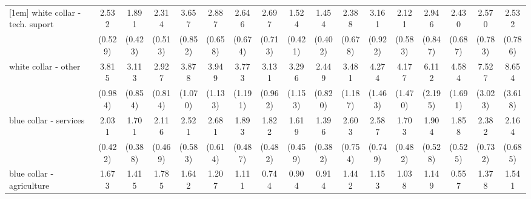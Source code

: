 {\begin{tabular}{l*{16}{c}}
[1em]
white collar - tech. suport&       2.532\sym{***}&       1.891\sym{**} &       2.314\sym{***}&       3.657\sym{***}&       2.887\sym{***}&       2.646\sym{***}&       2.697\sym{***}&       1.524         &       1.454         &       2.388\sym{**} &       3.161\sym{***}&       2.121\sym{**} &       2.946\sym{***}&       2.430\sym{**} &       2.570\sym{**} &       2.532\sym{**} \\
                    &     (0.529)         &     (0.423)         &     (0.513)         &     (0.852)         &     (0.658)         &     (0.674)         &     (0.713)         &     (0.421)         &     (0.402)         &     (0.678)         &     (0.922)         &     (0.583)         &     (0.847)         &     (0.687)         &     (0.783)         &     (0.786)         \\
[1em]
white collar - other&       3.815\sym{***}&       3.113\sym{***}&       2.927\sym{***}&       3.878\sym{***}&       3.949\sym{***}&       3.773\sym{***}&       3.131\sym{***}&       3.296\sym{***}&       2.449\sym{**} &       3.481\sym{***}&       4.274\sym{***}&       4.177\sym{***}&       6.112\sym{***}&       4.584\sym{***}&       7.527\sym{***}&       8.654\sym{***}\\
                    &     (0.984)         &     (0.854)         &     (0.814)         &     (1.070)         &     (1.133)         &     (1.191)         &     (0.962)         &     (1.153)         &     (0.820)         &     (1.187)         &     (1.463)         &     (1.470)         &     (2.195)         &     (1.691)         &     (3.023)         &     (3.618)         \\
[1em]
blue collar - services&       2.031\sym{***}&       1.701\sym{*}  &       2.116\sym{***}&       2.521\sym{***}&       2.681\sym{***}&       1.893\sym{*}  &       1.822\sym{*}  &       1.619         &       1.396         &       2.603\sym{***}&       2.587\sym{**} &       1.703         &       1.904\sym{*}  &       1.858\sym{*}  &       2.382\sym{**} &       2.164\sym{*}  \\
                    &     (0.422)         &     (0.388)         &     (0.469)         &     (0.583)         &     (0.614)         &     (0.487)         &     (0.482)         &     (0.459)         &     (0.382)         &     (0.754)         &     (0.749)         &     (0.482)         &     (0.528)         &     (0.525)         &     (0.732)         &     (0.685)         \\
[1em]
blue collar - agriculture&       1.673         &       1.415         &       1.785         &       1.642         &       1.207         &       1.111         &       0.744         &       0.904         &       0.914         &       1.442         &       1.153         &       1.038         &       1.149         &       0.557         &       1.378         &       1.541         \\

\end{tabular}}
